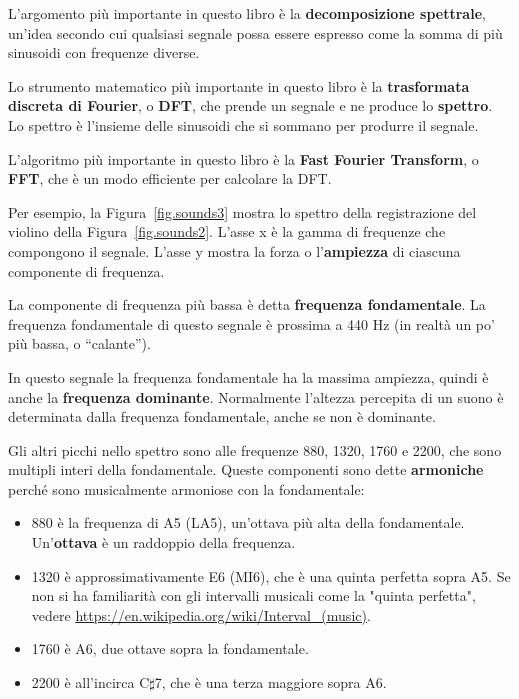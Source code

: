 \documentclass[12pt]{book} \usepackage[width=5.5in,height=8.5in, hmarginratio=3:2,vmarginratio=1:1]{geometry}
\begin{document}
L'argomento più importante in questo libro è la {\bf decomposizione spettrale}, un'idea secondo cui qualsiasi segnale possa essere espresso come la somma di più sinusoidi con frequenze diverse.

Lo strumento matematico più importante in questo libro è la {\bf trasformata discreta di Fourier}, o {\bf DFT}, che prende un segnale e ne produce lo {\bf spettro}. Lo spettro è l'insieme delle sinusoidi che si sommano per produrre il segnale.

L'algoritmo più importante in questo libro è la {\bf Fast Fourier Transform}, o {\bf FFT}, che è un modo efficiente per calcolare la DFT.

Per esempio, la Figura~\ref{fig.sounds3} mostra lo spettro della registrazione del violino della Figura~\ref{fig.sounds2}. L'asse x è la gamma di frequenze che compongono il segnale. L'asse y mostra la forza o l'{\bf ampiezza} di ciascuna componente di frequenza.

La componente di frequenza più bassa è detta {\bf frequenza fondamentale}. La frequenza fondamentale di questo segnale è prossima a 440 Hz (in realtà un po' più bassa, o ``calante'').

In questo segnale la frequenza fondamentale ha la massima ampiezza, quindi è anche la {\bf frequenza dominante}. Normalmente l'altezza percepita di un suono è determinata dalla frequenza fondamentale, anche se non è dominante.

Gli altri picchi nello spettro sono alle frequenze 880, 1320, 1760 e 2200, che sono multipli interi della fondamentale. Queste componenti sono dette {\bf armoniche} perché sono musicalmente armoniose con la fondamentale:

\begin{itemize} 

\item 880 è la frequenza di A5 (LA5), un'ottava più alta della fondamentale. Un'{\bf ottava} è un raddoppio della frequenza.

\item 1320 è approssimativamente E6 (MI6), che è una quinta perfetta sopra A5. Se non si ha familiarità con gli intervalli musicali come la "quinta perfetta", vedere \url{https://en.wikipedia.org/wiki/Interval_(music)}.

\item 1760 è A6, due ottave sopra la fondamentale.

\item 2200 è all'incirca C$\sharp$7, che è una terza maggiore sopra A6.

\end{itemize} 
\end{document}
